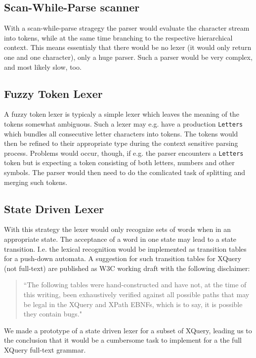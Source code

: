 \subsection{Scan-While-Parse scanner}
\label{sect:ambiguousgrammar:scanWhileParse}
With a scan-while-parse stragegy the parser would evaluate the character stream into tokens, while at the same time branching to the respective hierarchical context. This means essentialy that there would be no lexer (it would only return one and one character), only a huge parser. Such a parser would be very complex, and most likely slow, too.

\subsection{Fuzzy Token Lexer}
A fuzzy token lexer is typicaly a simple lexer which leaves the meaning of the tokens somewhat ambiguous. Such a lexer may e.g. have a production \verb!Letters! which bundles all consecutive letter characters into tokens. The tokens would then be refined to their appropriate type during the context sensitive parsing process. Problems would occur, though, if e.g. the parser encounters a \verb!Letters! token but is expecting a token consisting of both letters, numbers and other symbols. The parser would then need to do the comlicated task of splitting and merging such tokens.

\subsection{State Driven Lexer}
\label{sect:amiguousgrammar:stateDriven}
With this strategy the lexer would only recognize sets of words when in an appropriate state. The acceptance of a word in one state may lead to a state transition. I.e. the lexical recognition would be implemented as transition tables for a push-down automata. A suggestion for such transition tables for XQuery (not full-text) are published as W3C working draft\cite{createTokenizer} with the following disclaimer:
\begin{quote}
``The following tables were hand-constructed and have not, at the time of this writing, been exhaustively verified against all possible paths that may be legal in the XQuery and XPath EBNFs, which is to say, it is possible they contain bugs."
\end{quote}
We made a prototype of a state driven lexer for a subset of XQuery, leading us to the conclusion that it would be a cumbersome task to implement for a the full XQuery full-text grammar.

